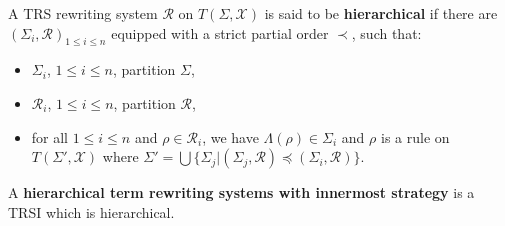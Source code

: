     \begin{definition}
      A TRS rewriting system $\mathcal{R}$ on $T(\Sigma, \mathcal{X})$ is said to be \textbf{hierarchical} if there are $(\Sigma_i, \mathcal{R})_{1 \leq i \leq n}$ equipped with a strict partial order $\prec$, such that:
      \begin{itemize}
        \item $\Sigma_i$, $1 \leq i \leq n$, partition $\Sigma$,
        \item $\mathcal{R}_i$, $1 \leq i \leq n$, partition $\mathcal{R}$,
        \item for all $1 \leq i \leq n$ and $\rho \in \mathcal{R}_i$, we have $\Lambda(\rho) \in \Sigma_i$ and $\rho$ is a rule on $T(\Sigma', \mathcal{X})$ where 
        $\Sigma' = \bigcup \{ \Sigma_j | (\Sigma_j, \mathcal{R}) \preceq (\Sigma_i, \mathcal{R}) \}$.
      \end{itemize}
    \end{definition}
  
    \begin{definition}
       A \textbf{hierarchical term rewriting systems with innermost strategy} is a TRSI which is hierarchical.
    \end{definition}
  
  

